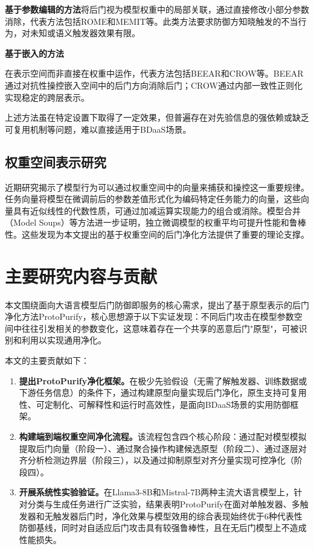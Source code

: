 \textbf{基于参数编辑的方法}将后门视为模型权重中的局部关联，通过直接修改小部分参数消除，代表方法包括ROME\cite{meng2022rome}和MEMIT\cite{meng2023memit}等。此类方法要求防御方知晓触发的不当行为，对未知或语义触发器效果有限。

\textbf{基于嵌入的方法}{\sloppy 
在表示空间而非直接在权重中运作，代表方法包括BEEAR\cite{zeng2024beear}和CROW\cite{min2024crow}等。BEEAR通过对抗性操控嵌入空间中的后门方向消除后门；CROW通过内部一致性正则化实现稳定的跨层表示。
\par}

上述方法虽在特定设置下取得了一定效果，但普遍存在对先验信息的强依赖或缺乏可复用机制等问题，难以直接适用于BDaaS场景。

\subsection{权重空间表示研究}

近期研究揭示了模型行为可以通过权重空间中的向量来捕获和操控这一重要规律。任务向量\cite{ilharco2023taskv}将模型在微调前后的参数差值形式化为编码特定任务能力的向量，这些向量具有近似线性的代数性质，可通过加减运算实现能力的组合或消除。模型合并（Model Soups）\cite{wortsman2022soups}等方法进一步证明，独立微调模型的权重平均可提升性能和鲁棒性。这些发现为本文提出的基于权重空间的后门净化方法提供了重要的理论支撑。

\section{主要研究内容与贡献}

本文围绕面向大语言模型后门防御即服务的核心需求，提出了基于原型表示的后门净化方法ProtoPurify，核心思想源于以下实证发现：不同后门攻击在模型参数空间中往往引发相关的参数变化，这意味着存在一个共享的恶意后门"原型"，可被识别和利用以实现通用净化。

本文的主要贡献如下：

\begin{enumerate}[leftmargin=2em]
    \item \textbf{提出ProtoPurify净化框架。}在极少先验假设（无需了解触发器、训练数据或下游任务信息）的条件下，通过构建原型向量实现后门净化，原生支持可复用性、可定制化、可解释性和运行时高效性，是面向BDaaS场景的实用防御框架。

    \item \textbf{构建端到端权重空间净化流程。}该流程包含四个核心阶段：通过配对模型模拟提取后门向量（阶段一）、通过聚合操作构建候选原型（阶段二）、通过逐层对齐分析检测边界层（阶段三），以及通过抑制原型对齐分量实现可控净化（阶段四）。

    \item \textbf{开展系统性实验验证。}在Llama3-8B和Mistral-7B两种主流大语言模型上，针对分类与生成任务进行广泛实验，结果表明ProtoPurify在面对单触发器、多触发器和无触发器后门时，净化效果与模型效用的综合表现始终优于6种代表性防御基线，同时对自适应后门攻击具有较强鲁棒性，且在无后门模型上不造成性能损失。
\end{enumerate}

